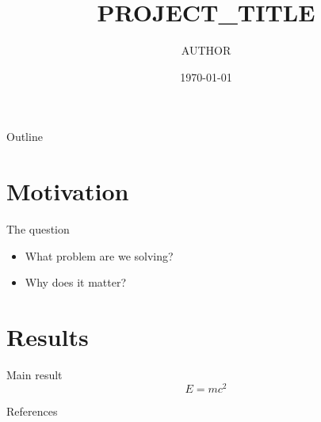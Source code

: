\documentclass[aspectratio=169]{beamer}
\title{{{PROJECT_TITLE}}}
\author{{{AUTHOR}}}
\institute{Department, University}
\date{\today}
\begin{document}
\maketitle

\begin{frame}{Outline}
  \tableofcontents
\end{frame}

\section{Motivation}
\begin{frame}{The question}
  \begin{itemize}
    \item What problem are we solving?
    \item Why does it matter?~\cite{einstein1905}
  \end{itemize}
\end{frame}

\section{Results}
\begin{frame}{Main result}
  \begin{equation*}
    E = mc^2
  \end{equation*}
\end{frame}

\begin{frame}{References}
  
  
\end{frame}
\end{document}
